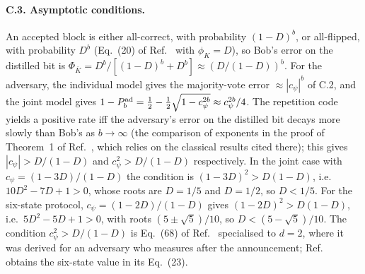 \documentclass[aps,pra,twocolumn,superscriptaddress,nofootinbib]{revtex4-2}
\begin{document}
\paragraph*{C.3. Asymptotic conditions.} An accepted block is either all-correct, with probability $(1-D)^b$, or all-flipped, with probability $D^b$ (Eq.~(20) of Ref.~\cite{T25} with $\phi_K=D$), so Bob's error on the distilled bit is $\Phi_{\bar K}=D^b/[(1-D)^b+D^b]\approx(D/(1-D))^b$. For the adversary, the individual model gives the majority-vote error $\approx|c_\psi|^b$ of C.2, and the joint model gives $1-P^{\rm ad}_b=\tfrac12-\tfrac12\sqrt{1-c_\psi^{2b}}\approx c_\psi^{2b}/4$. The repetition code yields a positive rate iff the adversary's error on the distilled bit decays more slowly than Bob's as $b\to\infty$ (the comparison of exponents in the proof of Theorem~1 of Ref.~\cite{GW99}, which relies on the classical results cited there); this gives $|c_\psi|>D/(1-D)$ and $c_\psi^2>D/(1-D)$ respectively. In the joint case with $c_\psi=(1-3D)/(1-D)$ the condition is $(1-3D)^2>D(1-D)$, i.e.\ $10D^2-7D+1>0$, whose roots are $D=1/5$ and $D=1/2$, so $D<1/5$. For the six-state protocol, $c_\psi=(1-2D)/(1-D)$ gives $(1-2D)^2>D(1-D)$, i.e.\ $5D^2-5D+1>0$, with roots $(5\pm\sqrt5)/10$, so $D<(5-\sqrt5)/10$. The condition $c_\psi^2>D/(1-D)$ is Eq.~(68) of Ref.~\cite{BA07} specialised to $d=2$, where it was derived for an adversary who measures after the announcement; Ref.~\cite{ABBMM06} obtains the six-state value in its Eq.~(23).
\end{document}
